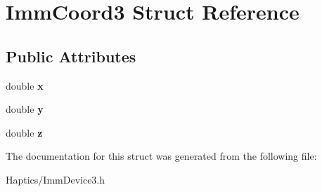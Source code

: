\hypertarget{structImmCoord3}{
\section{ImmCoord3 Struct Reference}
\label{structImmCoord3}
}
\subsection*{Public Attributes}
\begin{DoxyCompactItemize}
\item 
\hypertarget{structImmCoord3_a8a9f07cd40b142e5ac8e1e3470fe76ad}{
double {\bfseries x}}
\label{structImmCoord3_a8a9f07cd40b142e5ac8e1e3470fe76ad}

\item 
\hypertarget{structImmCoord3_a3e36bbc8249c343c8eddfc13eb41add9}{
double {\bfseries y}}
\label{structImmCoord3_a3e36bbc8249c343c8eddfc13eb41add9}

\item 
\hypertarget{structImmCoord3_a5ca32bc4e59d3d5e22f6cc8254a62c72}{
double {\bfseries z}}
\label{structImmCoord3_a5ca32bc4e59d3d5e22f6cc8254a62c72}

\end{DoxyCompactItemize}


The documentation for this struct was generated from the following file:\begin{DoxyCompactItemize}
\item 
Haptics/ImmDevice3.h\end{DoxyCompactItemize}

